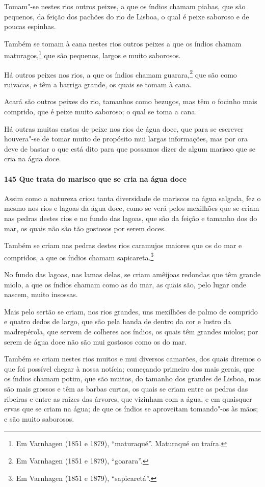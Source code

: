 \begin{linenumbers}
Tomam"-se nestes rios outros peixes, a que os índios chamam piabas, que são pequenos, da
feição dos pachões do rio de Lisboa, o qual é peixe saboroso e de poucas espinhas.

Também se tomam à cana nestes rios outros peixes a que os índios chamam
maturagos,\footnote{ Em Varnhagen (1851 e 1879), ``maturaqué''. Maturaqué ou traíra.} que
são pequenos, largos e muito saborosos.

Há outros peixes nos rios, a que os índios chamam guarara,\footnote{ Em Varnhagen (1851 e
1879), ``goarara''.} que são como ruivacas, e têm a barriga grande, os quais se tomam à
cana.

Acará são outros peixes do rio, tamanhos como bezugos, mas têm o focinho mais comprido,
que é peixe muito saboroso; o qual se toma a cana.

Há outras muitas castas de peixe nos rios de água doce, que para se escrever houvera"-se de
tomar muito de propósito mui largas informações, mas por ora deve de bastar o que está
dito para que possamos dizer de algum marisco que se cria na água doce.

\paragraph{145 Que trata do marisco que se cria na água doce}\quad
Assim como a natureza criou tanta diversidade de mariscos na água salgada, fez o mesmo nos
rios e lagoas da água doce, como se verá pelos mexilhões que se criam nas pedras destes
rios e no fundo das lagoas, que são da feição e tamanho dos do mar, os quais não são tão
gostosos por serem doces.

Também se criam nas pedras destes rios caramujos maiores que os do mar e compridos, a que
os índios chamam sapicareta.\footnote{ Em Varnhagen (1851 e 1879), ``sapicaretá''.}

No fundo das lagoas, nas lamas delas, se criam amêijoas redondas que têm grande miolo, a
que os índios chamam como as do mar, as quais são, pelo lugar onde nascem, muito insossas.

Mais pelo sertão se criam, nos rios grandes, uns mexilhões de palmo de comprido e quatro
dedos de largo, que são pela banda de dentro da cor e lustro da madrepérola, que servem de
colheres aos índios, os quais têm grandes miolos; por serem de água doce não são mui
gostosos como os do mar.

Também se criam nestes rios muitos e mui diversos camarões, dos quais diremos o que foi
possível chegar à nossa notícia; começando primeiro dos mais gerais, que os índios chamam
potim, que são muitos, do tamanho dos grandes de Lisboa, mas são mais grossos e têm as
barbas curtas, os quais se criam entre as pedras das ribeiras e entre as raízes das
árvores, que vizinham com a água, e em quaisquer ervas que se criam na água; de que os
índios se aproveitam tomando"-os às mãos; e são muito saborosos.


\end{linenumbers}
